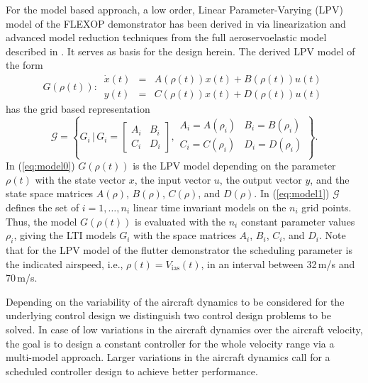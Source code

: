 \documentclass[aerospace,article,submit,moreauthors,pdftex,10pt,a4paper]{Definitions/mdpi}
\begin{document}
For the model based approach, a low order, Linear Parameter-Varying (LPV) model of the FLEXOP demonstrator  has been derived in \cite{luspay18, Luspay18a} via linearization and advanced model reduction techniques from the full aeroservoelastic model described in \cite{Wuestenhagen18}. It serves as basis for the design herein. The derived LPV model of the form
\begin{equation}\label{eq:model0}
G(\rho(t)): \,
\begin{array}{rcl}
\dot x(t) &=& A(\rho(t)) x(t) + B  (\rho(t)) u(t) \\
y(t) &=& C(\rho(t)) x(t) + D(\rho(t)) u(t)
\end{array}
\end{equation}
has the grid based representation
\begin{equation}\label{eq:model1}
{\mathcal{G}} = \left\{ G_i \, | \, G_i = 
\left[
\begin{smallmatrix}
A_i & B_i \\ C_i & D_i
\end{smallmatrix}
\right],
\begin{smallmatrix}
A_i = A(\rho_i)& B_i = B(\rho_i)\\
C_i = C(\rho_i)& D_i = D(\rho_i)\\
\end{smallmatrix}
\right\}.
\end{equation}
In (\ref{eq:model0})  $G(\rho(t))$ is the LPV model depending on the parameter $\rho(t)$ with the state vector $x$, the input vector $u$,  the output vector $y$, and the state space matrices $A(\rho)$, $B(\rho)$, $C(\rho)$, and $D(\rho)$. In (\ref{eq:model1})  $\mathcal{G}$ defines the set of $i=1,\dots,n_i$ linear time invariant models on the $n_i$ grid points. Thus, the model $G(\rho(t))$ is evaluated with the $n_i$ constant parameter values $\rho_i$, giving the LTI models $G_i$  with the space matrices $A_i$, $B_i$, $C_i$, and $D_i$.
Note that for the  LPV model of the flutter demonstrator the scheduling parameter is the indicated airspeed, i.e., $\rho(t) = V_\text{ias}(t)$, in an interval between 32\,m/s and 70\,m/s.

Depending on the variability of the aircraft dynamics to be considered for the underlying control design we distinguish two control design problems to be solved. In case of low variations in the aircraft dynamics over the aircraft velocity, the goal is to design a constant controller for the whole velocity range via a multi-model approach. Larger variations in the aircraft dynamics call for a scheduled controller design to achieve better performance. 
\end{document}
